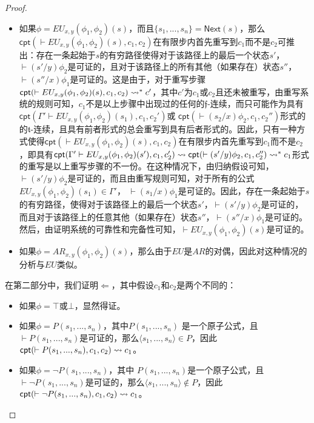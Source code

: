 \begin{proof}
\begin{itemize}
		\item 如果$\phi = EU_{x,y}(\phi_1,\phi_2)(s)$，而且$\{s_1,...,s_n\}=\textsf{Next}(s)$，那么\\$\textsf{cpt}(\vdash EU_{x,y}(\phi_1,\phi_2)(s), c_1,c_2)$在有限步内首先重写到$c_1$而不是$c_2$可推出：存在一条起始于$s$的有穷路径使得对于该路径上的最后一个状态$s'$，$\vdash (s'/y)\phi_2$是可证的，且对于该路径上的所有其他（如果存在）状态$s''$，$\vdash(s''/x)\phi_1$是可证的。这是由于，对于重写步骤$\textsf{cpt}(\vdash EU_{x,y}(\phi_1,\phi_2)(s), c_1,c_2)\rightsquigarrow^*c'$，其中$c'$为$c_1$或$c_2$且还未被重写，由重写系统的规则可知，$c_1$不是以上步骤中出现过的任何\CPT{}的$\mathfrak{f}$-连续，而只可能作为具有 \\$\textsf{cpt}(\Gamma'\vdash EU_{x,y}(\phi_1,\phi_2)(s_1), c_1, c_2')$或 $\textsf{cpt}(\vdash (s_2/x)\phi_2, c_1, c_2'')$形式的\CPT{}的$\mathfrak{t}$-连续，且具有前者形式的\CPT{}总会重写到具有后者形式的\CPT{}。因此，只有一种方式使得$\textsf{cpt}(\vdash EU_{x,y}(\phi_1,\phi_2)(s), c_1, c_2)$在有限步内首先重写到$c_1$而不是$c_2$，即具有$\textsf{cpt}(\Gamma'\vdash EU_{x,y}(\phi_1,\phi_2)(s'), c_1, c_2')\rightsquigarrow \textsf{cpt}(\vdash (s'/y)\phi_2, c_1,c_2'')\rightsquigarrow^* c_1$形式的重写是以上重写步骤的不一份。在这种情况下，由归纳假设可知，$\vdash (s'/y)\phi_2$是可证的，而且由重写规则可知，对于所有的公式$EU_{x,y}(\phi_1,\phi_2)(s_1)\in\Gamma'$， $\vdash (s_1/x)\phi_1$是可证的。因此，存在一条起始于$s$的有穷路径，使得对于该路径上的最后一个状态$s'$，$\vdash (s'/y)\phi_2$是可证的，而且对于该路径上的任意其他（如果存在）状态$s''$，$\vdash(s''/x)\phi_1$是可证的。 然后，由证明系统的可靠性和完备性可知，$\vdash EU_{x,y}(\phi_1,\phi_2)(s)$是可证的。
		
		\item 
		如果$\phi = AR_{x,y}(\phi_1,\phi_2)(s)$，那么由于$EU$是$AR$的对偶，因此对这种情况的分析与$EU$类似。
	\end{itemize}
	
	在第二部分中，我们证明$\Leftarrow$，其中假设$c_1$和$c_2$是两个不同的\CPT：
	\begin{itemize}
		\item 如果$\phi=\top$或$\bot$，显然得证。
		
		\item 如果$\phi=P(s_1,...,s_n)$，其中$P(s_1,...,s_n)$ 是一个原子公式，且$\vdash P(s_1,...,s_n)$是可证的，那么$\langle s_1,...,s_n\rangle\in P$，因此 $\textsf{cpt}(\vdash P(s_1,...,s_n), c_1, c_2)\rightsquigarrow c_1$。
		
		\item 如果$\phi=\neg P(s_1,...,s_n)$，其中 $P(s_1,...,s_n)$是一个原子公式，且$\vdash \neg P(s_1,...,s_n)$是可证的，那么$\langle s_1,...,s_n\rangle \notin P$，因此 $\textsf{cpt}(\vdash \neg P(s_1,...,s_n), c_1, c_2)\rightsquigarrow c_1$。
		

\end{itemize}
\end{proof}
